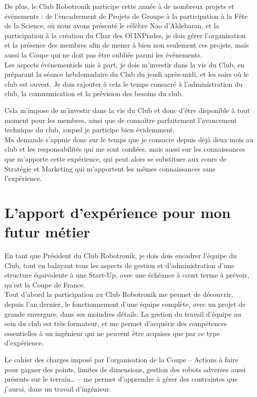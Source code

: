 \documentclass[a4paper,11pt]{article} \usepackage[T1]{fontenc} \usepackage[utf8]{inputenc} \usepackage[francais]{babel}
\begin{document}
De plus, le Club Robotronik participe cette année à de nombreux projets et événements : de l'encadrement de Projets de Groupe à la participation à la Fête de la Science, où nous avons présenté le célèbre Nao d'Aldebaran, et la participation à la création du Char des Ol'INPiades, je dois gérer l'organisation et la présence des membres afin de mener à bien non seulement ces projets, mais aussi la Coupe qui ne doit pas être oubliée parmi les événements.\\

Les aspects événementiels mis à part, je dois m'investir dans la vie du Club, en préparant la séance hebdomadaire du Club du jeudi après-midi, et les soirs où le club est ouvert. Je dois rajouter à cela le temps consacré à l'administration du club, la communication et la prévision des besoins du club.

Cela m'impose de m'investir dans la vie du Club et donc d'être disponible à tout moment pour les membres, ainsi que de connaître parfaitement l'avancement technique du club, auquel je participe bien évidemment.\\

Ma demande s'appuie donc sur le temps que je consacre depuis déjà deux mois au club et les responsabilités qui me sont confiées, mais aussi sur les connaissances que m'apporte cette expérience, qui peut alors se substituer aux cours de Stratégie et Marketing qui m'apportent les mêmes connaissances sans l'expérience.

\part{L'apport d'expérience pour mon futur métier}
    En tant que Président du Club Robotronik, je dois dois encadrer l'équipe du Club, tout en balayant tous les aspects de gestion et d'administration d'une structure équivalente à une Start-Up, avec une échéance à court terme à prévoir, qu'est la Coupe de France.\\

    Tout d'abord la participation au Club Robotronik me permet de découvrir, depuis l'an dernier, le fonctionnement d'une équipe complète, avec un projet de grande envergure, dans ses moindres détails. La gestion du travail d'équipe au sein du club est très formateur, et me permet d'acquérir des compétences essentielles à un ingénieur qui ne peuvent être acquises que par ce type d'expérience.

    Le cahier des charges imposé par l'organisation de la Coupe -- Actions à faire pour gagner des points, limites de dimensions, gestion des robots adverses aussi présents sur le terrain… -- me permet d'apprendre à gérer des contraintes que j'aurai, dans un travail d'ingénieur.\\
\end{document}
